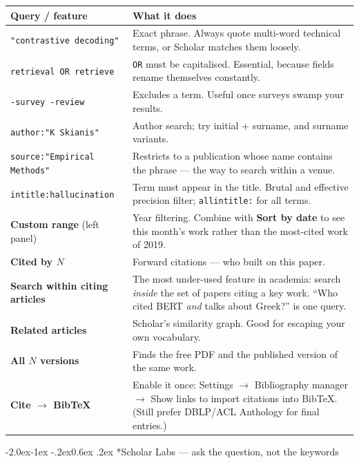 \documentclass[11pt,a4paper]{article}
\makeatletter
\renewcommand\subsubsection{\@startsection{subsubsection}{3}{\z@}%
  {-2.0ex\@plus -1ex \@minus -.2ex}{0.6ex \@plus .2ex}%
  {\normalfont\normalsize\bfseries\color{ink}}}
\newcommand{\thead}[1]{\textbf{\color{brand}#1}}
\newcommand{\code}[1]{\texttt{\small #1}}
\makeatother
\begin{document}
\begin{table}[h]
\centering
\small
\begin{tabularx}{\textwidth}{L{5.0cm} X}
\toprule
\thead{Query / feature} & \thead{What it does} \\
\midrule
{}
\code{"contrastive decoding"} & Exact phrase. Always quote multi-word technical
terms, or Scholar matches them loosely. \\
\code{retrieval OR retrieve} & \code{OR} must be capitalised. Essential,
because fields rename themselves constantly. \\
\code{-survey -review} & Excludes a term. Useful once surveys swamp your
results. \\
\code{author:"K Skianis"} & Author search; try initial + surname, and
surname variants. \\
\code{source:"Empirical Methods"} & Restricts to a publication whose name
contains the phrase --- the way to search within a venue. \\
\code{intitle:hallucination} & Term must appear in the title. Brutal and
effective precision filter; \code{allintitle:} for all terms. \\
\textbf{Custom range} (left panel) & Year filtering. Combine with
\textbf{Sort by date} to see this month's work rather than the most-cited work
of 2019. \\
\textbf{Cited by $N$} & Forward citations --- who built on this paper. \\
\textbf{Search within citing articles} & The most under-used feature in
academia: search \emph{inside} the set of papers citing a key work. ``Who cited
BERT \emph{and} talks about Greek?'' is one query. \\
\textbf{Related articles} & Scholar's similarity graph. Good for escaping your
own vocabulary. \\
\textbf{All $N$ versions} & Finds the free PDF and the published version of the
same work. \\
\textbf{Cite $\rightarrow$ BibTeX} & Enable it once: Settings $\rightarrow$
Bibliography manager $\rightarrow$ Show links to import citations into BibTeX.
(Still prefer DBLP/ACL Anthology for final entries.) \\
\bottomrule
\end{tabularx}
\end{table}

\subsubsection*{Scholar Labs --- ask the question, not the keywords}
\end{document}
